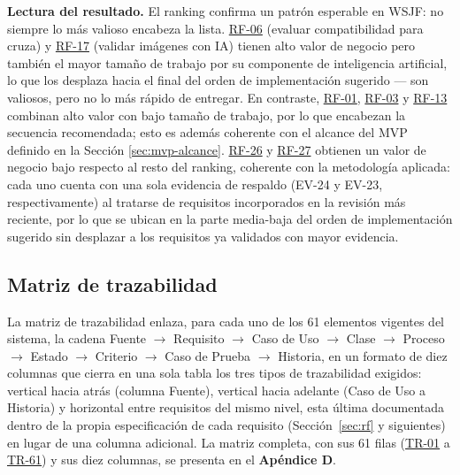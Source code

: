 \documentclass[journal,onecolumn]{IEEEtran}
\begin{document}
	\textbf{Lectura del resultado.} El ranking confirma un patrón esperable en
	WSJF: no siempre lo más valioso encabeza la lista. \hyperref[tab:RF-06]{RF-06} (evaluar
	compatibilidad para cruza) y \hyperref[tab:RF-17]{RF-17} (validar imágenes con IA) tienen alto
	valor de negocio pero también el mayor tamaño de trabajo por su componente
	de inteligencia artificial, lo que los desplaza hacia el final del orden de
	implementación sugerido --- son valiosos, pero no lo más rápido de
	entregar. En contraste, \hyperref[tab:RF-01]{RF-01}, \hyperref[tab:RF-03]{RF-03} y \hyperref[tab:RF-13]{RF-13} combinan alto valor con bajo
	tamaño de trabajo, por lo que encabezan la secuencia recomendada; esto es
	además coherente con el alcance del MVP definido en la Sección
	\ref{sec:mvp-alcance}. \hyperref[tab:RF-26]{RF-26} y \hyperref[tab:RF-27]{RF-27} obtienen un valor de negocio bajo
	respecto al resto del ranking, coherente con la metodología aplicada: cada
	uno cuenta con una sola evidencia de respaldo (EV-24 y EV-23,
	respectivamente) al tratarse de requisitos incorporados en la revisión más
	reciente, por lo que se ubican en la parte media-baja del orden de
	implementación sugerido sin desplazar a los requisitos ya validados con
	mayor evidencia.
	
\subsection{Matriz de trazabilidad}
\label{sec:trazabilidad}

La matriz de trazabilidad enlaza, para cada uno de los 61 elementos
vigentes del sistema, la cadena Fuente $\rightarrow$ Requisito
$\rightarrow$ Caso de Uso $\rightarrow$ Clase $\rightarrow$ Proceso
$\rightarrow$ Estado $\rightarrow$ Criterio $\rightarrow$ Caso de Prueba
$\rightarrow$ Historia, en un formato de diez columnas que cierra en una
sola tabla los tres tipos de trazabilidad exigidos: vertical hacia atrás
(columna Fuente), vertical hacia adelante (Caso de Uso a Historia) y
horizontal entre requisitos del mismo nivel, esta última documentada
dentro de la propia especificación de cada requisito (Sección~\ref{sec:rf}
y siguientes) en lugar de una columna adicional. La matriz completa, con
sus 61 filas (\hyperref[tr:01]{TR-01} a \hyperref[tr:61]{TR-61}) y sus diez columnas, se presenta en el
\textbf{Apéndice D}.
\end{document}
